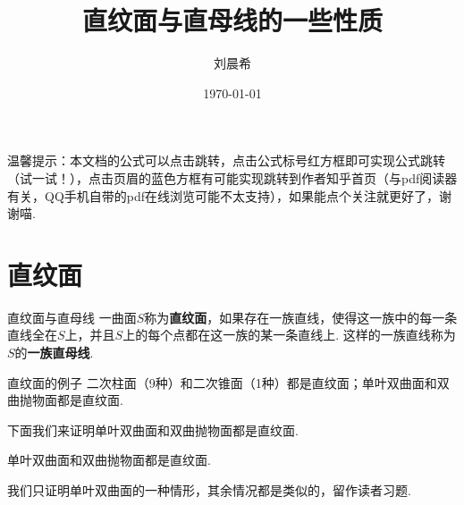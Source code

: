 \documentclass[12pt, a4paper,newtx]{ctexart}
\title{\textbf{直纹面与直母线的一些性质}}
\author{刘晨希}
\date{\today}
\begin{document}
	
	\maketitle
	温馨提示：本文档的公式可以点击跳转，点击公式标号红方框即可实现公式跳转（试一试！），点击页眉的蓝色方框有可能实现跳转到作者知乎首页（与pdf阅读器有关，QQ手机自带的pdf在线浏览可能不太支持），如果能点个关注就更好了，谢谢喵. 
\section{直纹面}
\begin{definition}{直纹面与直母线}{}\kaishu 
	一曲面$S$称为\textbf{直纹面}，如果存在一族直线，使得这一族中的每一条直线全在$S$上，并且$S$上的每个点都在这一族的某一条直线上. 这样的一族直线称为$S$的\textbf{一族直母线}.
\end{definition}
\begin{example}{直纹面的例子}{}
	二次柱面（9种）和二次锥面（1种）都是直纹面；单叶双曲面和双曲抛物面都是直纹面. 
\end{example}
下面我们来证明单叶双曲面和双曲抛物面都是直纹面. 
\begin{theorem}{}{}
	单叶双曲面和双曲抛物面都是直纹面. 
\end{theorem}
我们只证明单叶双曲面的一种情形，其余情况都是类似的，留作读者习题. 
\end{document}
